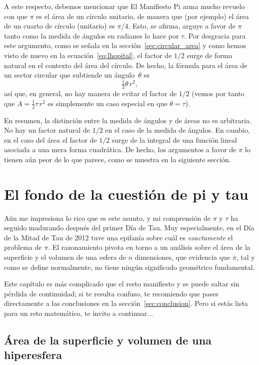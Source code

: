 A este respecto, debemos mencionar que El Manifiesto Pi arma mucho revuelo con que $\pi$ es el área de un círculo unitario, de manera que (por ejemplo) el área de un cuarto de círculo (unitario) es $\pi/4$. Esto, se afirma, arguye a favor de $\pi$ tanto como la medida de ángulos en radianes lo hace por $\tau$. Por desgracia para este argumento, como se señala en la sección~\ref{sec:circular_area} y como hemos visto de nuevo en la ecuación~\eqref{eq:lhopital}, el factor de $1/2$ surge de forma natural en el contexto del área del círculo. De hecho, la fórmula para el área de un sector circular que subtiende un ángulo~$\theta$ es
\[
\tfrac{1}{2}\theta\, r^2,
\]
así que, en general, no hay manera de evitar el factor de $1/2$ (vemos por tanto que $A = \frac{1}{2} \tau\, r^2$ es simplemente un caso especial en que  $\theta = \tau$).

En resumen, la distinción entre la medida de ángulos y de áreas no es arbitraria. No hay un factor natural de $1/2$ en el caso de la medida de ángulos. En cambio, en el caso del área el factor de $1/2$ surge de la integral de una función lineal asociada a una mera forma cuadrática. De hecho, los argumentos a favor de $\pi$ lo tienen aún peor de lo que parece, como se muestra en la siguiente sección.


\section{El fondo de la cuestión de pi y tau} %
\label{sec:getting_to_the_bottom_of_pi}

Aún me impresiona lo rico que es este asunto, y mi comprensión de $\pi$ y $\tau$ ha seguido madurando después del primer Día de Tau. Muy especialmente, en el Día de la Mitad de Tau de 2012 tuve una epifanía sobre cuál es \emph{exactamente} el problema de $\pi$. El razonamiento pivota en torno a un análisis sobre el área de la superficie y el volumen de una esfera de $n$ dimensiones, que evidencia que $\pi$, tal y como se define normalmente, no tiene ningún significado geométrico fundamental. 

Este capítulo es más complicado que el resto manifiesto y se puede saltar sin pérdida de continuidad; si te resulta confuso, te recomiendo que pases directamente a las conclusiones en la sección~\ref{sec:conclusion}. Pero si estás lista para un reto matemático, te invito a continuar...

  \subsection{Área de la superficie y volumen de una hiperesfera} %
  \label{sec:volume_of_a_hypersphere}


